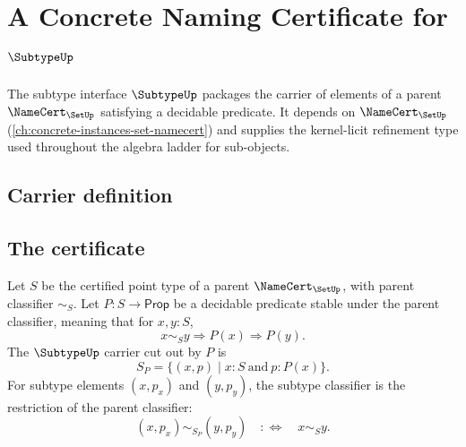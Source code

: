 \chapter{A Concrete Naming Certificate for $\SubtypeUp$}
\label{ch:concrete-instances-subtype-namecert}

The subtype interface $\SubtypeUp$ packages the carrier of elements of a parent $\NameCert_{\SetUp}$ satisfying a decidable predicate. It depends on $\NameCert_{\SetUp}$ (\autoref{ch:concrete-instances-set-namecert}) and supplies the kernel-licit refinement type used throughout the algebra ladder for sub-objects.

\section{Carrier definition}
\label{sec:subtype-carrier}

\section{The certificate}
\label{sec:subtype-certificate}

\begin{definition}
\label{def:subtype-restricted-classifier}
Let $S$ be the certified point type of a parent $\NameCert_{\SetUp}$, with
parent classifier $\sim_S$. Let $P:S\to\mathsf{Prop}$ be a decidable predicate
stable under the parent classifier, meaning that for $x,y:S$,
$$
x\sim_S y\Longrightarrow P(x)\Longrightarrow P(y).
$$
The $\SubtypeUp$ carrier cut out by $P$ is
$$
S_P=\{(x,p)\mid x:S\ \text{and}\ p:P(x)\}.
$$
For subtype elements $(x,p_x)$ and $(y,p_y)$, the subtype classifier is the
restriction of the parent classifier:
$$
(x,p_x)\sim_{S_P}(y,p_y)\quad:\Longleftrightarrow\quad x\sim_S y.
$$
\end{definition}

